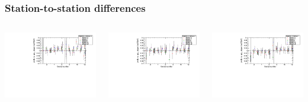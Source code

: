 \documentclass[compress]{beamer}
\begin{document}
\begin{frame}
\frametitle{Station-to-station differences}

\begin{columns}
\includegraphics[width=\linewidth]{bfield_dxdz_slopes_nosignswitch_34.pdf}

\includegraphics[width=\linewidth]{bfield_dxdz_slopes_nosignswitch_23.pdf}

\includegraphics[width=\linewidth]{bfield_dxdz_slopes_nosignswitch_12.pdf}


\end{columns}
\end{frame}
\end{document}
